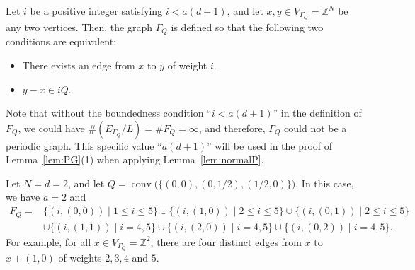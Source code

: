 \documentclass[ALCO,published]{cedram}
\theoremstyle{remark}
\begin{document}
\begin{rmk}\label{rmk:GammaQ}
Let $i$ be a positive integer satisfying $i<a(d+1)$, and let $x, y \in V_{\Gamma _Q} = \mathbb{Z}^N$ be any two vertices. 
Then, the graph $\Gamma _Q$ is defined so that the following two conditions are equivalent: 
\begin{itemize}
\item
There exists an edge from $x$ to $y$ of weight $i$. 
 \item
$y - x \in i Q$.
\end{itemize}

Note that without the boundedness condition ``$i < a(d+1)$'' in the definition of $F_{Q}$, 
we could have $\# \left( E_{\Gamma _Q}/L \right) = \# F_Q = \infty$, and therefore, $\Gamma _Q$ could not be a periodic graph. 
This specific value ``$a(d+1)$'' will be used in the proof of Lemma~\ref{lem:PG}(1) when applying Lemma~\ref{lem:normalP}. 
\end{rmk}
\begin{ex}
Let $N = d = 2$, and let $Q = \operatorname{conv} \bigl( \bigl\{ (0, 0), (0, 1/2), (1/2, 0) \bigr\} \bigr)$. 
In this case, we have $a = 2$ and 
\begin{align*}
F_{Q} ={}
&\{ (i, (0,0)) \mid 1 \le i \le 5 \} 
\cup \{ (i,(1,0)) \mid 2 \le i \le 5 \} 
\cup \{ (i,(0,1)) \mid 2 \le i \le 5 \}\\
&\cup \{ (i,(1,1)) \mid i = 4,5 \} 
\cup \{ (i,(2,0)) \mid i = 4,5 \} 
\cup \{ (i,(0,2)) \mid i = 4,5 \}. 
\end{align*}
For example, for all $x \in V_{\Gamma _Q} = \mathbb{Z}^2$, there are four distinct edges from $x$ to $x + (1,0)$ of weights $2, 3, 4$ and $5$. 
\end{ex}
\end{document}
